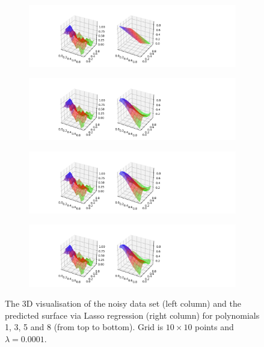 \begin{figure}[!ht]
\begin{subfigure}{\textwidth}
  \centering
  \includegraphics[width=1\linewidth]{images/surf/fake_lasso_p01_n10.png}
\end{subfigure}
\begin{subfigure}{\textwidth}
  \centering
  \includegraphics[width=1\linewidth]{images/surf/fake_lasso_p03_n10.png}
\end{subfigure}
\begin{subfigure}{\textwidth}
  \centering
  \includegraphics[width=1\linewidth]{images/surf/fake_lasso_p05_n10.png}
\end{subfigure}
\begin{subfigure}{\textwidth}
  \centering
  \includegraphics[width=1\linewidth]{images/surf/fake_lasso_p08_n10.png}
\end{subfigure}
\caption{The 3D visualisation of the noisy data set (left column) and the predicted surface via Lasso regression (right column) for polynomials 1, 3, 5 and 8 (from top to bottom). Grid is $10\times10$ points and $\lambda = 0.0001$.}
\label{fig:lasso-surf1}
\end{figure}

